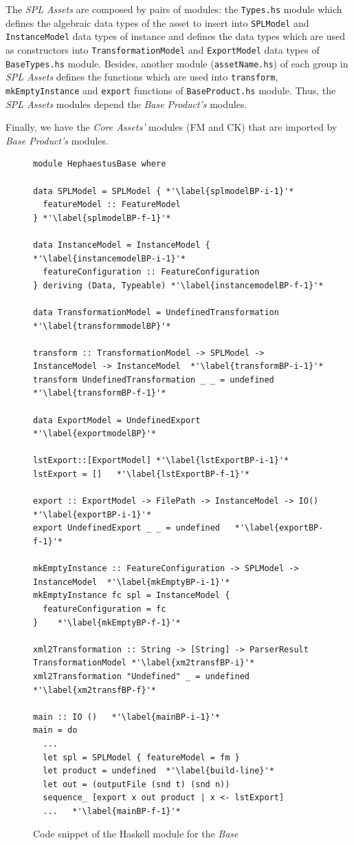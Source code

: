 The \textit{SPL Assets} are composed by pairs of modules: the \texttt{Types.hs} module which defines the algebraic data types of the asset to insert into \texttt{SPLModel} and \texttt{InstanceModel} data types of \hpl{} instance and defines the data types which are used as constructors into \texttt{TransformationModel} and \texttt{ExportModel} data types of \texttt{BaseTypes.hs} module. 
Besides, another module (\texttt{assetName.hs}) of each group in \textit{SPL Assets} defines the functions which are used into \texttt{transform}, \texttt{mkEmptyInstance} and \texttt{export} functions of \texttt{BaseProduct.hs} module. Thus, the \textit{SPL Assets} modules depend the \textit{Base Product's} modules.

Finally, we have the \textit{Core Assets'} modules (FM and CK) that are imported by \textit{Base Product's} modules.


\begin{figure}[t!]
\begin{lstlisting}
module HephaestusBase where

data SPLModel = SPLModel { *'\label{splmodelBP-i-1}'*
  featureModel :: FeatureModel
} *'\label{splmodelBP-f-1}'*

data InstanceModel = InstanceModel { *'\label{instancemodelBP-i-1}'*
  featureConfiguration :: FeatureConfiguration
} deriving (Data, Typeable) *'\label{instancemodelBP-f-1}'*

data TransformationModel = UndefinedTransformation *'\label{transformmodelBP}'*

transform :: TransformationModel -> SPLModel -> InstanceModel -> InstanceModel  *'\label{transformBP-i-1}'*
transform UndefinedTransformation _ _ = undefined  *'\label{transformBP-f-1}'*

data ExportModel = UndefinedExport *'\label{exportmodelBP}'*

lstExport::[ExportModel] *'\label{lstExportBP-i-1}'*
lstExport = []   *'\label{lstExportBP-f-1}'*

export :: ExportModel -> FilePath -> InstanceModel -> IO()  *'\label{exportBP-i-1}'*
export UndefinedExport _ _ = undefined   *'\label{exportBP-f-1}'*

mkEmptyInstance :: FeatureConfiguration -> SPLModel -> InstanceModel  *'\label{mkEmptyBP-i-1}'*
mkEmptyInstance fc spl = InstanceModel {
  featureConfiguration = fc
}    *'\label{mkEmptyBP-f-1}'*

xml2Transformation :: String -> [String] -> ParserResult TransformationModel *'\label{xm2transfBP-i}'*
xml2Transformation "Undefined" _ = undefined *'\label{xm2transfBP-f}'*

main :: IO ()   *'\label{mainBP-i-1}'*
main = do
  ...
  let spl = SPLModel { featureModel = fm }
  let product = undefined  *'\label{build-line}'*
  let out = (outputFile (snd t) (snd n))
  sequence_ [export x out product | x <- lstExport]
  ...   *'\label{mainBP-f-1}'*
\end{lstlisting}
\caption{Code snippet of the Haskell module for the \hp{} \emph{Base}}
\label{fig:code-HephaestusBase}
\end{figure}

